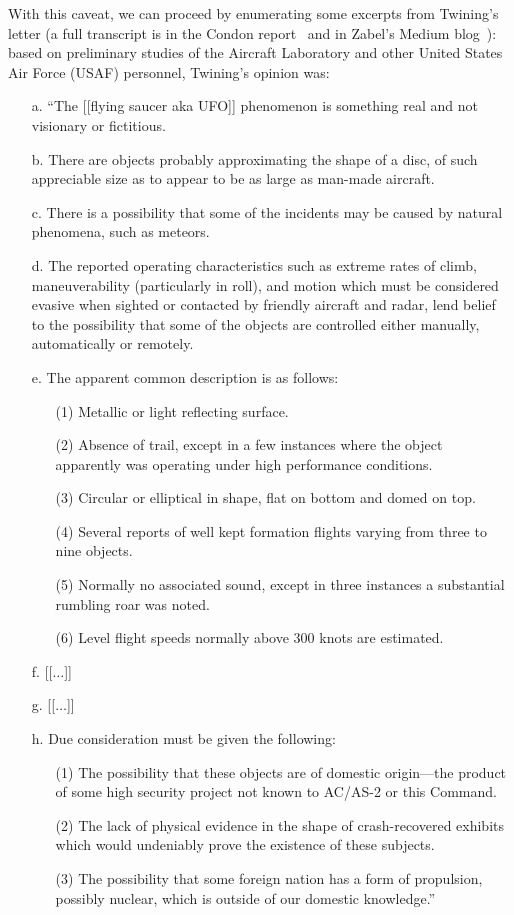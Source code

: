 With this caveat, we can proceed by enumerating some excerpts from Twining's letter
(a full transcript is in the Condon report~\cite[AppendixR]{Condon-report} and in Zabel's Medium blog~\cite{Zabel2022Mar}): based on preliminary studies of the Aircraft Laboratory and other United States Air Force (USAF) personnel, Twining's opinion was:
\begin{svgraybox}
\begin{enumerate}
\item[a.] ``The [[flying saucer aka UFO]] phenomenon is something real and not visionary or fictitious.
\item[b.] There are objects probably approximating the shape of a disc, of such appreciable size as to appear to be as large as man-made aircraft.
\item[c.] There is a possibility that some of the incidents may be caused by natural phenomena, such as meteors.
\item[d.] The reported operating characteristics such as extreme rates of climb, maneuverability (particularly in roll), and motion which must be considered evasive when sighted or contacted by friendly aircraft and radar, lend belief to the possibility that some of the objects are controlled either manually, automatically or remotely.
\item[e.] The apparent common description is as follows:
\begin{enumerate}
\item[(1)] Metallic or light reflecting surface.
\item[(2)] Absence of trail, except in a few instances where the object apparently was operating under high performance conditions.
\item[(3)] Circular or elliptical in shape, flat on bottom and domed on top.
\item[(4)] Several reports of well kept formation flights varying from three to nine objects.
\item[(5)] Normally no associated sound, except in three instances a substantial rumbling roar was noted.
\item[(6)] Level flight speeds normally above 300 knots are estimated.
\end{enumerate}
\item[f.] [[$\ldots$]]
\item[g.] [[$\ldots$]]
\item[h. ] Due consideration must be given the following:
\begin{enumerate}
\item[(1)] The possibility that these objects are of domestic origin---the product of some high security project not known to AC/AS-2 or this Command.
\item[(2)] The lack of physical evidence in the shape of crash-recovered exhibits which would undeniably prove the existence of these subjects.
\item[(3)] The possibility that some foreign nation has a form of propulsion, possibly nuclear, which is outside of our domestic knowledge.''
\end{enumerate}
\end{enumerate}
\end{svgraybox}


